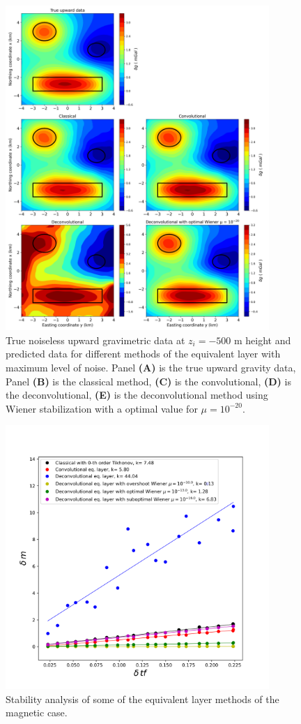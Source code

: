 \begin{figure}[htbp]
	\begin{center}
		\includegraphics[width=10cm]{Fig/grav_upward}
	\end{center}
	\caption{True noiseless upward gravimetric data at $z_i = -500$ m height and predicted data for different methods of the equivalent layer with maximum level of noise. Panel \textbf{(A)} is the true upward gravity data, Panel \textbf{(B)} is the classical method, \textbf{(C)} is the convolutional, \textbf{(D)} is the deconvolutional, \textbf{(E)} is the deconvolutional method using Wiener stabilization with a optimal value for $\mu = 10^{-20}$.}
	\label{fig:grav_up}
\end{figure}

\begin{figure}[htbp]
	\begin{center}
		\includegraphics[width=10cm]{Fig/stability_mag}
	\end{center}
	\caption{Stability analysis of some of the equivalent layer methods of the magnetic case.}
	\label{fig:6}
\end{figure}

